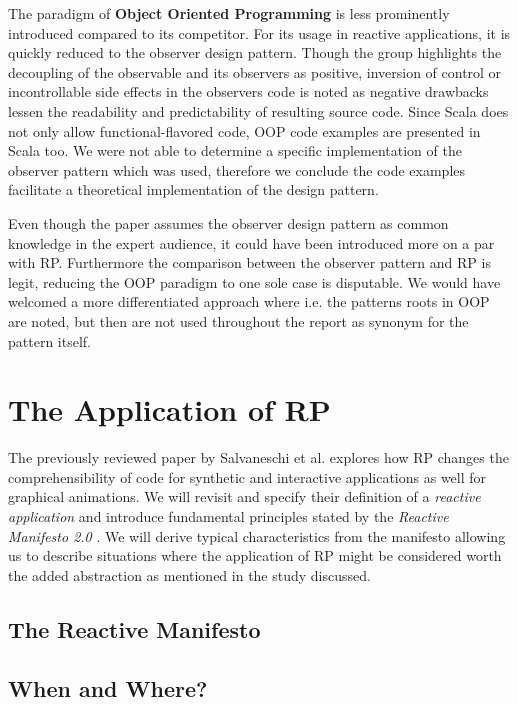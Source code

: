 \documentclass[12pt,a4paper]{article}
\begin{document}
The paradigm of \textbf{Object Oriented Programming} is less prominently introduced compared to its competitor. For its usage in reactive applications, it is quickly reduced to the observer design pattern. Though the group highlights the decoupling of the observable and its observers as positive, inversion of control or incontrollable side effects in the observers code is noted as negative drawbacks lessen the readability and predictability of resulting source code. Since Scala does not only allow functional-flavored code, OOP code examples are presented in Scala too. We were not able to determine a specific implementation of the observer pattern which was used, therefore we conclude the code examples facilitate a theoretical implementation of the design pattern.

Even though the paper assumes the observer design pattern as common knowledge in the expert audience, it could have been introduced more on a par with RP. Furthermore the comparison between the observer pattern and RP is legit, reducing the OOP paradigm to one sole case is disputable. We would have welcomed a more differentiated approach where i.e. the patterns roots in OOP are noted, but then are not used throughout the report as synonym for the pattern itself.

\section{The Application of RP}

The previously reviewed paper by Salvaneschi et al. explores how RP changes the comprehensibility of code for synthetic and interactive applications as well for graphical animations. We will revisit and specify their definition of a \emph{reactive application} and introduce fundamental principles stated by the \emph{Reactive Manifesto 2.0} \cite{reactivemanifesto}. We will derive typical characteristics from the manifesto allowing us to describe situations where the application of RP might be considered worth the added abstraction as mentioned in the study discussed.

\subsection{The Reactive Manifesto}

\subsection{When and Where?}
\end{document}
